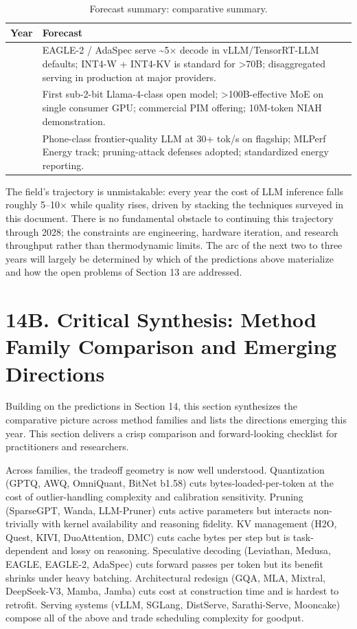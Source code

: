 \documentclass{article}
\begin{document}
\begin{table}[t]
\centering
\caption{Forecast summary: comparative summary.}
\label{tab:forecast-summary}
\begin{tabular}{>{\raggedright\arraybackslash}p{0.0244\linewidth}
  >{\raggedright\arraybackslash}p{0.9756\linewidth}}
\toprule
Year & Forecast \\
\midrule
2026 & EAGLE-2 / AdaSpec serve \textasciitilde5× decode in vLLM/TensorRT-LLM defaults; INT4-W + INT4-KV is standard for \textgreater70B; disaggregated serving in production at major providers. \\
2027 & First sub-2-bit Llama-4-class open model; \textgreater100B-effective MoE on single consumer GPU; commercial PIM offering; 10M-token NIAH demonstration. \\
2028 & Phone-class frontier-quality LLM at 30+ tok/s on flagship; MLPerf Energy track; pruning-attack defenses adopted; standardized energy reporting. \\
\end{tabular}
\end{table}

The field's trajectory is unmistakable: every year the cost of LLM inference falls roughly 5--10× while quality rises, driven by stacking the techniques surveyed in this document. There is no fundamental obstacle to continuing this trajectory through 2028; the constraints are engineering, hardware iteration, and research throughput rather than thermodynamic limits. The arc of the next two to three years will largely be determined by which of the predictions above materialize and how the open problems of Section 13 are addressed.

\section{14B. Critical Synthesis: Method Family Comparison and Emerging Directions}\label{b.-critical-synthesis-method-family-comparison-and-emerging-directions}

Building on the predictions in Section 14, this section synthesizes the comparative picture across method families and lists the directions emerging this year. This section delivers a crisp comparison and forward-looking checklist for practitioners and researchers.

Across families, the tradeoff geometry is now well understood. Quantization (GPTQ, AWQ, OmniQuant, BitNet b1.58) cuts bytes-loaded-per-token at the cost of outlier-handling complexity and calibration sensitivity. Pruning (SparseGPT, Wanda, LLM-Pruner) cuts active parameters but interacts non-trivially with kernel availability and reasoning fidelity. KV management (H2O, Quest, KIVI, DuoAttention, DMC) cuts cache bytes per step but is task-dependent and lossy on reasoning. Speculative decoding (Leviathan, Medusa, EAGLE, EAGLE-2, AdaSpec) cuts forward passes per token but its benefit shrinks under heavy batching. Architectural redesign (GQA, MLA, Mixtral, DeepSeek-V3, Mamba, Jamba) cuts cost at construction time and is hardest to retrofit. Serving systems (vLLM, SGLang, DistServe, Sarathi-Serve, Mooncake) compose all of the above and trade scheduling complexity for goodput.
\end{document}
